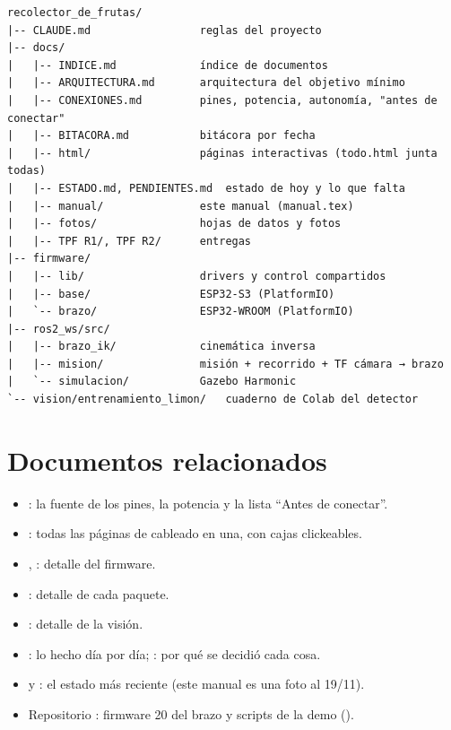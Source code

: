 \begin{lstlisting}
recolector_de_frutas/
|-- CLAUDE.md                 reglas del proyecto
|-- docs/
|   |-- INDICE.md             índice de documentos
|   |-- ARQUITECTURA.md       arquitectura del objetivo mínimo
|   |-- CONEXIONES.md         pines, potencia, autonomía, "antes de conectar"
|   |-- BITACORA.md           bitácora por fecha
|   |-- html/                 páginas interactivas (todo.html junta todas)
|   |-- ESTADO.md, PENDIENTES.md  estado de hoy y lo que falta
|   |-- manual/               este manual (manual.tex)
|   |-- fotos/                hojas de datos y fotos
|   |-- TPF R1/, TPF R2/      entregas
|-- firmware/
|   |-- lib/                  drivers y control compartidos
|   |-- base/                 ESP32-S3 (PlatformIO)
|   `-- brazo/                ESP32-WROOM (PlatformIO)
|-- ros2_ws/src/
|   |-- brazo_ik/             cinemática inversa
|   |-- mision/               misión + recorrido + TF cámara → brazo
|   `-- simulacion/           Gazebo Harmonic
`-- vision/entrenamiento_limon/   cuaderno de Colab del detector
\end{lstlisting}

\section{Documentos relacionados}
\begin{itemize}
  \item {}: la fuente de los pines, la potencia y la lista ``Antes de conectar''.
  \item {}: todas las páginas de cableado en una, con cajas clickeables.
  \item {}, : detalle del firmware.
  \item {}: detalle de cada paquete.
  \item {}: detalle de la visión.
  \item {}: lo hecho día por día; : por qué se decidió cada cosa.
  \item {} y : el estado más reciente (este manual es una foto al 19/11).
  \item Repositorio : firmware 20 del brazo y scripts de la demo ().
\end{itemize}
